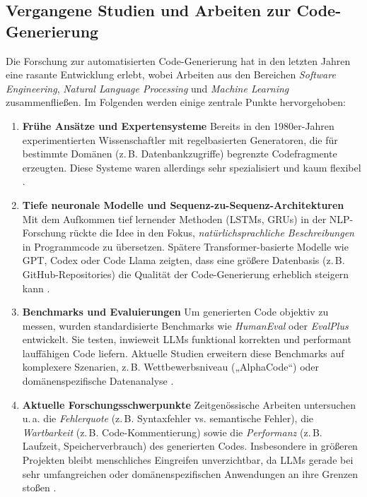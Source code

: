 \documentclass[11pt,a4paper]{article}
\begin{document}
\subsection{Vergangene Studien und Arbeiten zur Code-Generierung}
\label{sec:vergangene_studien}

Die Forschung zur automatisierten Code-Generierung hat in den letzten Jahren eine rasante Entwicklung erlebt, wobei Arbeiten aus den Bereichen \emph{Software Engineering}, \emph{Natural Language Processing} und \emph{Machine Learning} zusammenfließen. Im Folgenden werden einige zentrale Punkte hervorgehoben:

\begin{enumerate}
  \item \textbf{Frühe Ansätze und Expertensysteme}  
  Bereits in den 1980er-Jahren experimentierten Wissenschaftler mit regelbasierten Generatoren, die für bestimmte Domänen (z.\,B. Datenbankzugriffe) begrenzte Codefragmente erzeugten. Diese Systeme waren allerdings sehr spezialisiert und kaum flexibel \cite{Henderson2023LLMRefactor}.

  \item \textbf{Tiefe neuronale Modelle und Sequenz-zu-Sequenz-Architekturen}  
  Mit dem Aufkommen tief lernender Methoden (LSTMs, GRUs) in der NLP-Forschung rückte die Idee in den Fokus, \emph{natürlichsprachliche Beschreibungen} in Programmcode zu übersetzen. Spätere Transformer-basierte Modelle wie GPT, Codex oder Code Llama zeigten, dass eine größere Datenbasis (z.\,B. GitHub-Repositories) die Qualität der Code-Generierung erheblich steigern kann \cite{AlphaCodeDeepMind}.

  \item \textbf{Benchmarks und Evaluierungen}  
  Um generierten Code objektiv zu messen, wurden standardisierte Benchmarks wie \emph{HumanEval} \cite{OpenAI2021} oder \emph{EvalPlus} \cite{EvalPlus2023} entwickelt. Sie testen, inwieweit LLMs funktional korrekten und performant lauffähigen Code liefern. Aktuelle Studien erweitern diese Benchmarks auf komplexere Szenarien, z.\,B. Wettbewerbsniveau („AlphaCode“) \cite{Li2022AlphaCode} oder domänenspezifische Datenanalyse \cite{Wang2023DataCentric}.

  \item \textbf{Aktuelle Forschungsschwerpunkte}  
  Zeitgenössische Arbeiten untersuchen u.\,a. die \emph{Fehlerquote} (z.\,B. Syntaxfehler vs. semantische Fehler), die \emph{Wartbarkeit} (z.\,B. Code-Kommentierung) sowie die \emph{Performanz} (z.\,B. Laufzeit, Speicherverbrauch) des generierten Codes. Insbesondere in größeren Projekten bleibt menschliches Eingreifen unverzichtbar, da LLMs gerade bei sehr umfangreichen oder domänenspezifischen Anwendungen an ihre Grenzen stoßen \cite{Zhang2023CodexRevisited}.

\end{enumerate}
\end{document}
